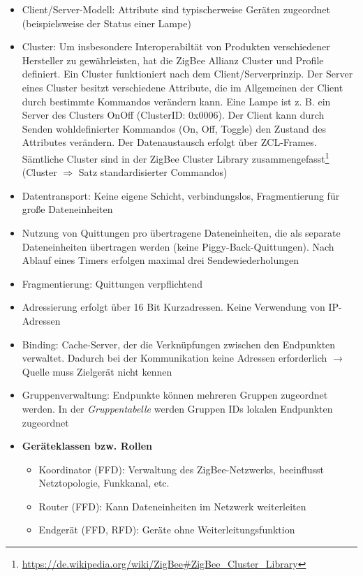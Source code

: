 \begin{itemize}
\begin{itemize}
\begin{itemize}
		\end{itemize}
		\item Client/Server-Modell: Attribute sind typischerweise Geräten zugeordnet (beispielsweise der Status einer Lampe)
		\item Cluster: Um insbesondere Interoperabiltät von Produkten verschiedener Hersteller zu gewährleisten, hat die ZigBee Allianz Cluster und Profile definiert. Ein Cluster funktioniert nach dem Client/Serverprinzip. Der Server eines Cluster besitzt verschiedene Attribute, die im Allgemeinen der Client durch bestimmte Kommandos verändern kann. Eine Lampe ist z. B. ein Server des Clusters OnOff (ClusterID: 0x0006). Der Client kann durch Senden wohldefinierter Kommandos (On, Off, Toggle) den Zustand des Attributes verändern. Der Datenaustausch erfolgt über ZCL-Frames. Sämtliche Cluster sind in der ZigBee Cluster Library zusammengefasst\footnote{\url{https://de.wikipedia.org/wiki/ZigBee\#ZigBee_Cluster_Library}} (Cluster \(\Rightarrow\) Satz standardisierter Commandos)
		\item Datentransport: Keine eigene Schicht, verbindungslos, Fragmentierung für große Dateneinheiten
		\item Nutzung von Quittungen pro übertragene Dateneinheiten, die als separate Dateneinheiten übertragen werden (keine Piggy-Back-Quittungen). Nach Ablauf eines Timers erfolgen maximal drei Sendewiederholungen
		\item Fragmentierung: Quittungen verpflichtend
		\item Adressierung erfolgt über 16 Bit Kurzadressen. Keine Verwendung von IP-Adressen
		\item Binding: Cache-Server, der die Verknüpfungen zwischen den Endpunkten verwaltet. Dadurch bei der Kommunikation keine Adressen erforderlich \(\rightarrow\) Quelle muss Zielgerät nicht kennen
		\item Gruppenverwaltung: Endpunkte können mehreren Gruppen zugeordnet werden. In der \textit{Gruppentabelle} werden Gruppen IDs lokalen Endpunkten zugeordnet
		\item \textbf{Geräteklassen bzw. Rollen}
		\begin{itemize}
			\item Koordinator (FFD): Verwaltung des ZigBee-Netzwerks, beeinflusst Netztopologie, Funkkanal, etc.
			\item Router (FFD): Kann Dateneinheiten im Netzwerk weiterleiten
			\item Endgerät (FFD, RFD): Geräte ohne Weiterleitungsfunktion
		\end{itemize}

\end{itemize}
\end{itemize}
